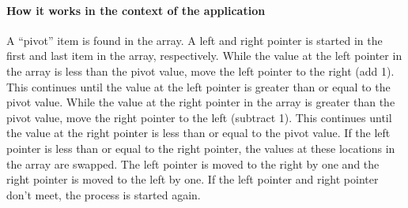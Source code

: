 \paragraph{How it works in the context of the application}
A “pivot” item is found in the array. A left and right pointer is started in the first and last item in the array, respectively. While the value at the left pointer in the array is less than the pivot value, move the left pointer to the right (add 1). This continues until the value at the left pointer is greater than or equal to the pivot value. While the value at the right pointer in the array is greater than the pivot value, move the right pointer to the left (subtract 1). This continues until the value at the right pointer is less than or equal to the pivot value. If the left pointer is less than or equal to the right pointer, the values at these locations in the array are swapped. The left pointer  is moved to the right by one and the right pointer is moved to the left by one. If the left pointer and right pointer don’t meet, the process is started again.

